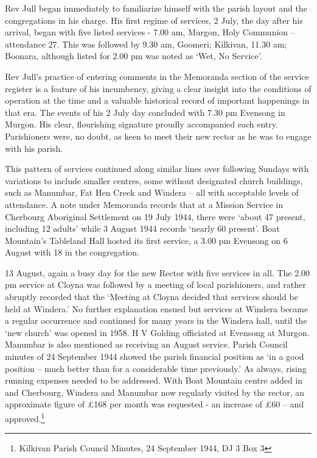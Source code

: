 Rev Jull began immediately to familiarize himself with the parish layout and the congregations in his charge. His first regime of services, 2 July, the day after his arrival, began with five listed services - 7.00 am, Murgon, Holy Communion -- attendance 27. This was followed by 9.30 am, Goomeri; Kilkivan, 11.30 am; Boonara, although listed for 2.00 pm was noted as `Wet, No Service'.



Rev Jull's practice of entering comments in the Memoranda section of the service register is a feature of his incumbency, giving a clear insight into the conditions of operation at the time and a valuable historical record of important happenings in that era. The events of his 2 July day concluded with 7.30 pm Evensong in Murgon. His clear, flourishing signature proudly accompanied each entry. Parishioners were, no doubt, as keen to meet their new rector as he was to engage with his parish.



This pattern of services continued along similar lines over following Sundays with variations to include smaller centres, some without designated church buildings, such as Manumbar, Fat Hen Creek and Windera -- all with acceptable levels of attendance. A note under Memoranda records that at a Mission Service in Cherbourg Aboriginal Settlement on 19 July 1944, there were `about 47 present, including 12 adults' while 3 August 1944 records `nearly 60 present'. Boat Mountain's Tableland Hall hosted its first service, a 3.00 pm Evensong on 6 August with 18 in the congregation.



13 August, again a busy day for the new Rector with five services in all. The 2.00 pm service at Cloyna was followed by a meeting of local parishioners, and rather abruptly recorded that the `Meeting at Cloyna decided that services should be held at Windera.' No further explanation ensued but services at Windera became a regular occurrence and continued for many years in the Windera hall, until the `new church' was opened in 1958. H V Golding officiated at Evensong at Murgon. Manumbar is also mentioned as receiving an August service. Parish Council minutes of 24 September 1944 showed the parish financial position as `in a good position -- much better than for a considerable time previously.' As always, rising running expenses needed to be addressed. With Boat Mountain centre added in and Cherbourg, Windera and Manumbar now regularly visited by the rector, an approximate figure of \pounds168 per month was requested - an increase of \pounds60 -- and approved.\footnote{Kilkivan Parish Council Minutes, 24 September 1944, DJ 3 Box 3}


